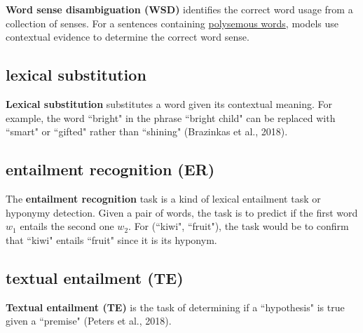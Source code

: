\textbf{Word sense disambiguation (WSD)} identifies the correct word usage from a collection of senses. For a sentences containing \hyperref[sec:Polysemy]{polysemous words}, models use contextual evidence to determine the correct word sense. 



\subsection{lexical substitution} \label{nlptask:lexicalsubstitution}

\textbf{Lexical substitution} substitutes a word given its contextual meaning. For example, the word ``bright" in the phrase ``bright child" can be replaced with ``smart" or ``gifted" rather than ``shining" (Brazinkas et al., 2018). 
 
\subsection{entailment recognition (ER)} \label{nlptask:entailmentrecognition}
 
The \textbf{entailment recognition} task is a kind of lexical entailment task or hyponymy detection. Given a pair of words, the task is to predict if the first word $w_1$ entails the second one $w_2$. For (``kiwi", ``fruit"), the task would be to confirm that ``kiwi" entails ``fruit" since it is its hyponym. 


\subsection{textual entailment (TE)} \label{nlptask:textualentailmentTE}
 
\textbf{Textual entailment (TE)} is the task of determining if a ``hypothesis" is true given a ``premise" (Peters et al., 2018). 


 

